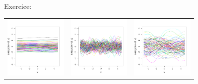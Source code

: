 \documentclass{beamer}
\begin{document}
\begin{frame}{}
\begin{exampleblock}{Exercice: }
\begin{center}
\begin{tabular}{ccc}
\includegraphics[height=3cm]{figures/R/MVN_traj150} &\includegraphics[height=3cm]{figures/R/MVN_traj105}& \includegraphics[height=3cm]{figures/R/MVN_traj33}
\end{tabular}
\end{center}
\end{exampleblock}
\end{frame}
\end{document}
